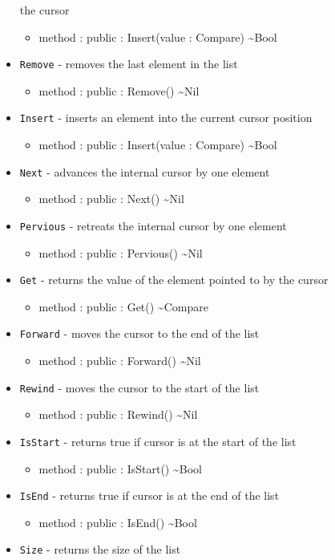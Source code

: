 \documentclass[12pt]{article}
\begin{document}
\begin{itemize}
  the cursor
  \begin{itemize}
  \item method : public : Insert(value : Compare) \textasciitilde Bool
  \end{itemize}
\item \texttt{Remove} - removes the last element in the list
  \begin{itemize}
  \item method : public : Remove() \textasciitilde Nil
  \end{itemize}
\item \texttt{Insert} - inserts an element into the current cursor
  position
  \begin{itemize}
  \item method : public : Insert(value : Compare) \textasciitilde Bool
  \end{itemize}
\item \texttt{Next} - advances the internal cursor by one element
  \begin{itemize}
  \item method : public : Next() \textasciitilde Nil
  \end{itemize}
\item \texttt{Pervious} - retreats the internal cursor by one element
  \begin{itemize}
  \item method : public : Pervious() \textasciitilde Nil
  \end{itemize}
\item \texttt{Get} - returns the value of the element pointed to by
  the cursor
  \begin{itemize}
  \item method : public : Get() \textasciitilde Compare
  \end{itemize}
\item \texttt{Forward} - moves the cursor to the end of the list
  \begin{itemize}
  \item method : public : Forward() \textasciitilde Nil
  \end{itemize}
\item \texttt{Rewind} - moves the cursor to the start of the list
  \begin{itemize}
  \item method : public : Rewind() \textasciitilde Nil
  \end{itemize}
\item \texttt{IsStart} - returns true if cursor is at the start of the
  list
  \begin{itemize}
  \item method : public : IsStart() \textasciitilde Bool
  \end{itemize}
\item \texttt{IsEnd} - returns true if cursor is at the end of the
  list
  \begin{itemize}
  \item method : public : IsEnd() \textasciitilde Bool
  \end{itemize}
\item \texttt{Size} - returns the size of the list
\end{itemize}
\end{document}
